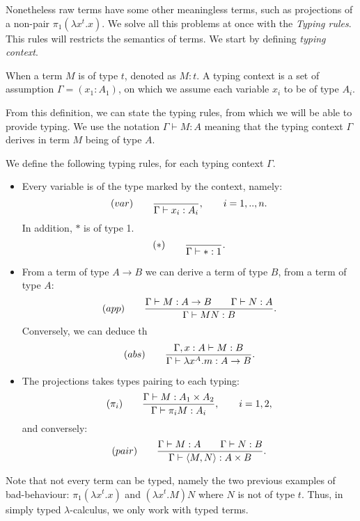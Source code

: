 Nonetheless raw terms have some other meaningless terms, such as projections of a non-pair $\pi_1(\lambda x^t.x)$. We solve all this problems at once with the \emph {Typing rules}. This rules will restricts the semantics of terms. We start by defining \emph{typing context}.

\begin{definition}
  When a term $M$ is of type $t$, denoted as $M:t$. A typing context is a set of assumption $\Gamma = (x_1:A_1)$, on which we assume each variable $x_i$ to be of type $A_i$.
\end{definition}

From this definition, we can state the typing rules, from which we will be able to provide typing. We use the notation $\Gamma \vdash M:A$ meaning that the typing context $\Gamma$ derives in term $M$ being of type $A$. 



\begin{definition}\label{def:typing-rules}
  We define the following typing rules, for each typing context $\Gamma$.
  \begin{itemize}
    \item Every variable is of the type marked by the context, namely:
$$  (var)\qquad  {\displaystyle \over \Gamma \vdash x_i:A_i},\qquad  i=  1,..,n.$$
In addition,  $*$ is of type 1.
    $$  (*)\qquad  {\displaystyle \over \Gamma\vdash *:1}.$$

\item From a term of type $A\to B$ we can derive a term of type $B$, from a term of type $A$:
  $$(app)\qquad  {\displaystyle \Gamma \vdash M:A\to B\qquad \Gamma \vdash N:A      \over \Gamma \vdash MN:B}.$$
  Conversely, we can deduce th
  $$(abs)\qquad  {\displaystyle \Gamma, x: A\vdash M: B  \over \Gamma \vdash \lambda x^A.m:A\to B}.$$
\item The projections takes types pairing to each typing:
  $$(\pi_i) \qquad {\displaystyle \Gamma\vdash M: A_1\times A_2 \over \Gamma \vdash \pi_i M: A_i},\qquad i=1,2,$$
and conversely:
    $$(pair) \qquad {\displaystyle \Gamma\vdash M: A\qquad \Gamma\vdash N: B \over \Gamma \vdash \langle M, N\rangle:  A\times B}.$$
  \end{itemize}
\end{definition}



Note that not every term can be typed, namely the two previous examples of bad-behaviour: $\pi_1(\lambda x^t. x)$ and $(\lambda x^t.M)N$ where $N$ is not of type $t$. Thus, in simply typed $\lambda$-calculus, we only work with typed terms.

